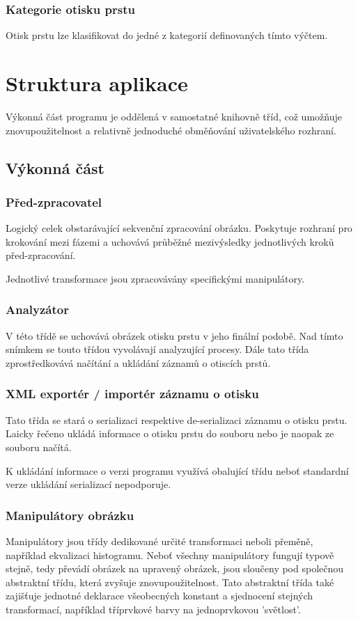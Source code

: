 \documentclass[12pt,a4paper]{article}
\let\oldsection\section
\renewcommand\section{\clearpage\oldsection}
\begin{document}
\subsubsection{Kategorie otisku prstu}

Otisk prstu lze klasifikovat do jedné z kategorií definovaných tímto výčtem.


\section{Struktura aplikace}
Výkonná část programu je oddělená v samostatné knihovně tříd, což umožňuje znovupoužitelnost a relativně jednoduché obměňování uživatelského rozhraní.

\subsection{Výkonná část}
\subsubsection{Před-zpracovatel}
Logický celek obstarávající sekvenční zpracování obrázku. Poskytuje rozhraní pro krokování mezi fázemi a uchovává průběžné mezivýsledky jednotlivých kroků před-zpracování.

Jednotlivé transformace jsou zpracovávány specifickými manipulátory.
\subsubsection{Analyzátor}
V této třídě se uchovává obrázek otisku prstu v jeho finální podobě. Nad tímto snímkem se touto třídou vyvolávají analyzující procesy. Dále tato třída zprostředkovává načítání a ukládání záznamů o otiscích prstů.

\subsubsection{XML exportér / importér záznamu o otisku}
Tato třída se stará o serializaci respektive de-serializaci záznamu o otisku prstu. Laicky řečeno ukládá informace o otisku prstu do souboru nebo je naopak ze souboru načítá. \par

K ukládání informace o verzi programu využívá obalující třídu neboť standardní verze ukládání serializací nepodporuje.

\subsubsection{Manipulátory obrázku}
Manipulátory jsou třídy dedikované určité transformaci neboli přeměně, například ekvalizaci histogramu. Neboť všechny manipulátory fungují typově stejně, tedy převádí obrázek na upravený obrázek, jsou sloučeny pod společnou abstraktní třídu, která zvyšuje znovupoužitelnost. Tato abstraktní třída také zajišťuje jednotné deklarace všeobecných konstant a sjednocení stejných transformací, například tříprvkové barvy na jednoprvkovou 'světlost'.
\end{document}
